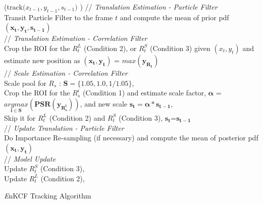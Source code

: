 \documentclass[10pt,twocolumn,letterpaper]{article}
\begin{document}
\begin{algorithm*}[h]
\small
\DontPrintSemicolon
{}
\Begin($\text{track($x_{t-1},y_{t-1},s_{t-1}$) }$)
{
 	// \textit{Translation Estimation - Particle Filter} \\
	Transit Particle Filter to the frame $t$ and compute the mean of prior pdf $\mathbf{(x_{t},y_{t},s_{t-1})}$ \\
     // \textit{Translation Estimation - Correlation Filter} \\
	Crop the ROI for the $R_{t}^{L}$ (Condition 2), or $R_{t}^{S}$ (Condition 3) given $(x_{t},y_{t})$ and estimate new position as $\mathbf{(x_{t},y_{t})}$ = $\mathbf{\textit{max}(y_{R_{t}})}$\\
	// \textit{Scale Estimation - Correlation Filter}\\
	Scale pool for $R_{s}$ : $\mathbf{S} = \lbrace1.05,1.0,1/1.05\rbrace$,\\
	Crop the ROI for the $R_{s}^{i}$ (Condition 1) and estimate scale factor, $\mathbf{\alpha}$ = $\mathbf{\underset{i\in S}{\textit{argmax}}(PSR(y_{R_{s}^{i}}))}$, and new scale $\mathbf{s_{t} = \alpha * s_{t-1}}$,\\ 
	Skip it for $R_{t}^{L}$ (Condition 2) and $R_{t}^{S}$ (Condition 3), $\mathbf{s_{t}}$=$\mathbf{s_{t-1}}$\\
	// \textit{Update Translation - Particle Filter}\\
	Do Importance Re-sampling (if necessary) and compute the 
	mean of posterior pdf $\mathbf{(x_{t},y_{t})}$\\
	// \textit{Model Update}\\
	Update $R_{t}^{S}$ (Condition 3),\\
	Update $R_{t}^{L}$ (Condition 2),\\
  \label{endfor}
}
\caption{{\it E}nKCF Tracking Algorithm}\label{alg:MKCF}
\end{algorithm*}
\end{document}
